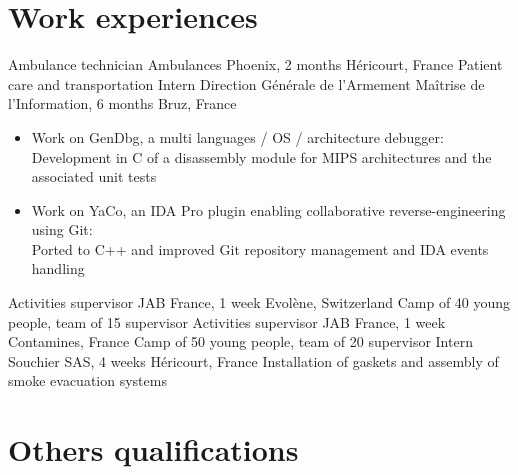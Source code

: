 \documentclass[letterpaper,10pt,sans]{moderncv}
\begin{document}

	\vspace*{\deletedSpace}
	\section{Work experiences}
			{Ambulance technician}
			{Ambulances Phoenix, 2 months}
			{Héricourt, France}
			{Patient care and transportation}
			{}
			{Intern}
			{Direction Générale de l'Armement Maîtrise de l'Information, 6 months}
			{Bruz, France}
			{}
			{}
			\vspace{-5pt}
			\begin{itemize}
				\item Work on GenDbg, a multi languages / OS / architecture debugger:\\
					\phantom{=}Development in C of a disassembly module for MIPS architectures and the associated unit tests
				\item Work on YaCo, an IDA Pro plugin enabling collaborative reverse-engineering using Git:\\
					\phantom{=}Ported to C++ and improved Git repository management and IDA events handling
			\end{itemize}
			\vspace{5pt}
			{Activities supervisor}
			{JAB France, 1 week}
			{Evolène, Switzerland}
			{Camp of 40 young people, team of 15 supervisor}
			{}
			{Activities supervisor}
			{JAB France, 1 week}
			{Contamines, France}
			{Camp of 50 young people, team of 20 supervisor}
			{}
			{Intern}
			{Souchier SAS, 4 weeks}
			{Héricourt, France}
			{Installation of gaskets and assembly of smoke evacuation systems}
			{}

	\newpage


	\section{Others qualifications}
\end{document}
